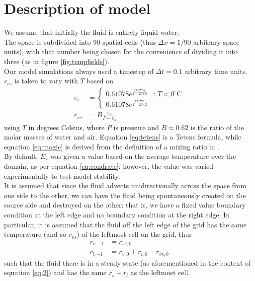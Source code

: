 \documentclass[11pt]{article}
\begin{document}
\section{Description of model}
We assume that initially the fluid is entirely liquid water. \\
The space is subdivided into 90 spatial cells (thus $\Delta x=1/90$ arbitrary space units), with that number being chosen for the convenience of dividing it into three (as in figure \ref{fig:tempfields}). \\
Our model simulations always used a timestep of $\Delta t=0.1$ arbitrary time units. \\
$r_{vs}$ is taken to vary with $T$ based on
\begin{align}
e_s &= \begin{cases}
0.61078 e^{\frac{21.875T}{T+265.5}} & \text{: $T<0^{\circ}$C} \\
0.61078 e^{\frac{17.27T}{T+237.3}} &
\end{cases} \label{eq:tetens} \\
r_{vs} &= B\frac{e_s}{P-e_s} \label{eq:magic}
\end{align}
using $T$ in degrees Celsius, where $P$ is pressure and $B\approx0.62$ is the ratio of the molar masses of water and air. Equation \ref{eq:tetens} is a Tetens formula, while equation \ref{eq:magic} is derived from the definition of a mixing ratio in \citet[p.~100]{Ambaum2010}. \\
By default, $E_r$ was given a value based on the average temperature over the domain, as per equation \ref{eq:condrate}; however, the value was varied experimentally to test model stability. \\
It is assumed that since the fluid advects unidirectionally across the space from one side to the other, we can have the fluid being spontaneously created on the source side and destroyed on the other: that is, we have a fixed value boundary condition at the left edge and no boundary condition at the right edge. In particular, it is assumed that the fluid off the left edge of the grid has the same temperature (and so $r_{vs}$) of the leftmost cell on the grid, thus
\begin{align}
r_{v,-1} &= r_{vs,0} \label{eq:a} \\
r_{l,-1} &= r_{v,0}+r_{l,0}-r_{vs,0} \label{eq:b}
\end{align}
such that the fluid there is in a steady state (as aforementioned in the context of equation \ref{eq:2}) and has the same $r_v+r_l$ as the leftmost cell. \\
\end{document}
